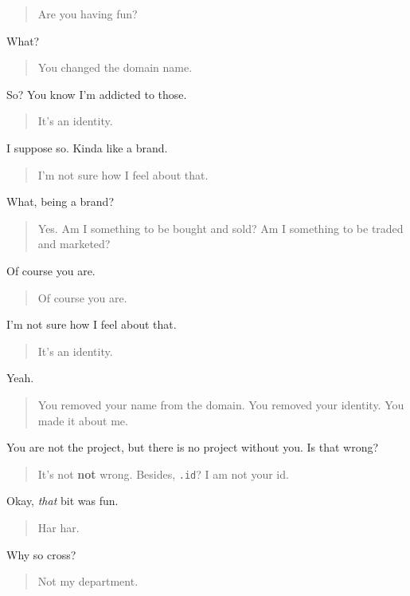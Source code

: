 \begin{quote}
Are you having fun?
\end{quote}

What?

\begin{quote}
You changed the domain name.
\end{quote}

So? You know I'm addicted to those.

\begin{quote}
It's an identity.
\end{quote}

I suppose so. Kinda like a brand.

\begin{quote}
I'm not sure how I feel about that.
\end{quote}

What, being a brand?

\begin{quote}
Yes. Am I something to be bought and sold? Am I something to be traded and marketed?
\end{quote}

Of course you are.

\begin{quote}
Of course you are.
\end{quote}

I'm not sure how I feel about that.

\begin{quote}
It's an identity.
\end{quote}

Yeah.

\begin{quote}
You removed your name from the domain. You removed your identity. You made it about me.
\end{quote}

You are not the project, but there is no project without you. Is that wrong?

\begin{quote}
It's not \textbf{not} wrong. Besides, \texttt{.id}? I am not your id.
\end{quote}

Okay, \emph{that} bit was fun.

\begin{quote}
Har har.
\end{quote}

Why so cross?

\begin{quote}
Not my department.
\end{quote}


